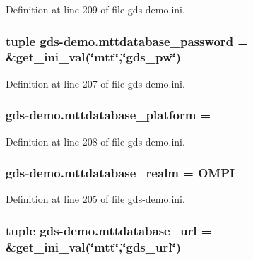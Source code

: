 Definition at line 209 of file gds-\/demo.\-ini.

\hypertarget{namespacegds-demo_aa5503d77b2af640cee7a9cddf64d32af}{
\subsubsection[{mttdatabase\-\_\-password}]{\setlength{\rightskip}{0pt plus 5cm}tuple gds-\/demo.\-mttdatabase\-\_\-password = \&get\-\_\-ini\-\_\-val(\char`\"{}mtt\char`\"{},\char`\"{}{\bf gds\-\_\-pw}\char`\"{})}}\label{namespacegds-demo_aa5503d77b2af640cee7a9cddf64d32af}


Definition at line 207 of file gds-\/demo.\-ini.

\hypertarget{namespacegds-demo_a5b63d22833bd28b9d8409c376db882e4}{
\subsubsection[{mttdatabase\-\_\-platform}]{\setlength{\rightskip}{0pt plus 5cm}gds-\/demo.\-mttdatabase\-\_\-platform =}}\label{namespacegds-demo_a5b63d22833bd28b9d8409c376db882e4}


Definition at line 208 of file gds-\/demo.\-ini.

\hypertarget{namespacegds-demo_af97c95f0978e6f297cd4893962369a06}{
\subsubsection[{mttdatabase\-\_\-realm}]{\setlength{\rightskip}{0pt plus 5cm}gds-\/demo.\-mttdatabase\-\_\-realm = O\-M\-P\-I}}\label{namespacegds-demo_af97c95f0978e6f297cd4893962369a06}


Definition at line 205 of file gds-\/demo.\-ini.

\hypertarget{namespacegds-demo_ad067871dce5c5a51f34693d833b0e0ef}{
\subsubsection[{mttdatabase\-\_\-url}]{\setlength{\rightskip}{0pt plus 5cm}tuple gds-\/demo.\-mttdatabase\-\_\-url = \&get\-\_\-ini\-\_\-val(\char`\"{}mtt\char`\"{},\char`\"{}{\bf gds\-\_\-url}\char`\"{})}}\label{namespacegds-demo_ad067871dce5c5a51f34693d833b0e0ef}


